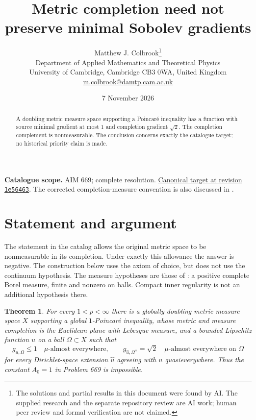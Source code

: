 \documentclass[11pt,a4paper]{article}
\newtheorem{theorem}{Theorem}[section]
\theoremstyle{remark}
\begin{document}
\title{Metric completion need not preserve minimal Sobolev gradients}
\author{Matthew J. Colbrook\thanks{The solutions and partial results in this document were found by AI. The supplied research and the separate repository review are AI work; human peer review and formal verification are not claimed.}\\[4pt]
\small Department of Applied Mathematics and Theoretical Physics\\
\small University of Cambridge, Cambridge CB3 0WA, United Kingdom\\
\small\href{mailto:m.colbrook@damtp.cam.ac.uk}{m.colbrook@damtp.cam.ac.uk}}
\date{7 November 2026}
\maketitle
\begin{abstract}
A doubling metric measure space supporting a Poincar\'e inequality has a function with source minimal gradient at most $1$ and completion gradient $\sqrt2$. The completion complement is nonmeasurable. The conclusion concerns exactly the catalogue target; no historical priority claim is made.
\end{abstract}
\noindent\textbf{Catalogue scope.} AIM 669; complete resolution. \href{https://github.com/MColbrook/AIM/blob/1e564633494c109edfd3ec46da1366adcff925a5/problems/669-does-metric-completion-preserve-minimal-sobolev-gradients.md}{Canonical target at revision \texttt{1e56463}}.
The corrected completion-measure convention is also discussed in \cite[Section 4]{BjornBjornLahti}.

\section{Statement and argument}
\label{sec:669}

The statement in the catalog allows the original metric space to be
nonmeasurable in its completion.  Under exactly this allowance the answer is
negative.  The construction below uses the axiom of choice, but does not use
the continuum hypothesis.  The measure hypotheses are those of
\cite{BjornBjorn}: a positive complete Borel measure, finite and nonzero on
balls.  Compact inner regularity is not an additional hypothesis there.

\begin{theorem}
For every $1<p<\infty$ there is a globally doubling metric measure space $X$
supporting a global $1$-Poincar\'e inequality, whose metric and measure
completion is the Euclidean plane with Lebesgue measure, and a bounded
Lipschitz function $u$ on a ball $\Omega\subset X$ such that
\[
 g_{u,\Omega}\leq 1\quad\text{$\mu$-almost everywhere},
 \qquad
 g_{\widehat u,\Omega^\wedge}=\sqrt{2}
       \quad\text{$\mu$-almost everywhere on $\Omega$}
\]
for every Dirichlet-space extension $\widehat u$ agreeing with $u$
quasieverywhere.  Thus the constant $A_0=1$ in Problem 669 is impossible.
\end{theorem}
\end{document}
